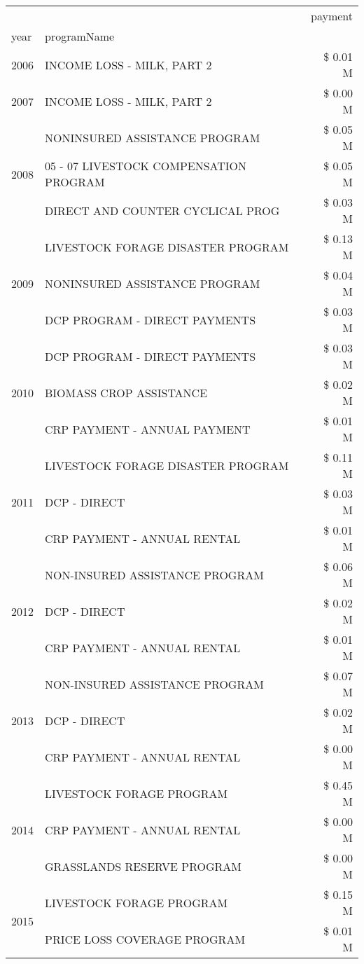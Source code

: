 \begin{tabular}{llr}
\toprule
 &  & payment \\
year & programName &  \\
\midrule
2006 & INCOME LOSS - MILK, PART 2 & \$ 0.01 M \\
\cline{1-3}
2007 & INCOME LOSS - MILK, PART 2 & \$ 0.00 M \\
\cline{1-3}
\multirow[t]{3}{*}{2008} & NONINSURED ASSISTANCE PROGRAM & \$ 0.05 M \\
 & 05 - 07 LIVESTOCK COMPENSATION PROGRAM & \$ 0.05 M \\
 & DIRECT AND COUNTER CYCLICAL PROG & \$ 0.03 M \\
\cline{1-3}
\multirow[t]{3}{*}{2009} & LIVESTOCK FORAGE DISASTER  PROGRAM & \$ 0.13 M \\
 & NONINSURED ASSISTANCE PROGRAM & \$ 0.04 M \\
 & DCP PROGRAM - DIRECT PAYMENTS & \$ 0.03 M \\
\cline{1-3}
\multirow[t]{3}{*}{2010} & DCP PROGRAM - DIRECT PAYMENTS & \$ 0.03 M \\
 & BIOMASS CROP ASSISTANCE & \$ 0.02 M \\
 & CRP PAYMENT - ANNUAL PAYMENT & \$ 0.01 M \\
\cline{1-3}
\multirow[t]{3}{*}{2011} & LIVESTOCK FORAGE DISASTER PROGRAM & \$ 0.11 M \\
 & DCP - DIRECT & \$ 0.03 M \\
 & CRP PAYMENT - ANNUAL RENTAL & \$ 0.01 M \\
\cline{1-3}
\multirow[t]{3}{*}{2012} & NON-INSURED ASSISTANCE PROGRAM & \$ 0.06 M \\
 & DCP - DIRECT & \$ 0.02 M \\
 & CRP PAYMENT - ANNUAL RENTAL & \$ 0.01 M \\
\cline{1-3}
\multirow[t]{3}{*}{2013} & NON-INSURED ASSISTANCE PROGRAM & \$ 0.07 M \\
 & DCP - DIRECT & \$ 0.02 M \\
 & CRP PAYMENT - ANNUAL RENTAL & \$ 0.00 M \\
\cline{1-3}
\multirow[t]{3}{*}{2014} & LIVESTOCK FORAGE PROGRAM & \$ 0.45 M \\
 & CRP PAYMENT - ANNUAL RENTAL & \$ 0.00 M \\
 & GRASSLANDS RESERVE PROGRAM & \$ 0.00 M \\
\cline{1-3}
\multirow[t]{3}{*}{2015} & LIVESTOCK FORAGE PROGRAM & \$ 0.15 M \\
 & PRICE LOSS COVERAGE PROGRAM & \$ 0.01 M \\

\end{tabular}
